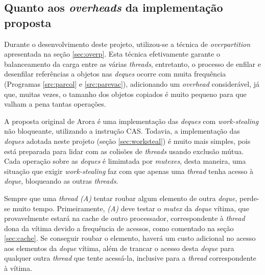 \documentclass[ccc, pg2]{esinucpel}
\begin{document}
\subsection{Quanto aos \textit{overheads} da implementação proposta}
Durante o desenvolvimento deste projeto, utilizou-se a técnica de {\it overpartition} apresentada na seção \ref{sec:overp}. Esta técnica efetivamente garante o balanceamento da carga entre as várias {\it threads}, entretanto, o processo de enfilar e desenfilar referências a objetos nas {\it deques} ocorre com muita frequência (Programas \ref{src:parcol} e \ref{src:parevac}), adicionando um {\it overhead} considerável, já que, muitas vezes, o tamanho dos objetos copiados é muito pequeno para que valham a pena tantas operações.

A proposta original de Arora \cite{bib:arora:worksteal} é uma implementação das {\it deques} com {\it work-stealing} não bloqueante, utilizando a instrução CAS. Todavia, a implementação das {\it deques} adotada neste projeto (seção \ref{sec:worksteal}) é muito mais simples, pois está preparada para lidar com as colisões de {\it threads} usando exclusão mútua. Cada operação sobre as {\it deques} é limimtada por {\it mutexes}, desta maneira, uma situação que exigir {\it work-stealing} faz com que apenas uma {\it thread} tenha acesso à {\it deque}, bloqueando as outras {\it threads}.

Sempre que uma {\it thread (A)} tentar roubar algum elemento de outra {\it deque}, perde-se muito tempo. Primeiramente, {\it (A)} deve testar o {\it mutex} da {\it deque} vítima, que provavelmente estará na cache de outro processador, correspondente à {\it thread} dona da vítima devido a frequência de acessos, como comentado na seção \ref{sec:cache}. Se conseguir roubar o elemento, haverá um custo adicional no acesso aos elementos da {\it deque} vítima, além de trancar o acesso desta {\it deque} para qualquer outra {\it thread} que tente acessá-la, inclusive para a {\it thread} correspondente à vítima.
\end{document}
